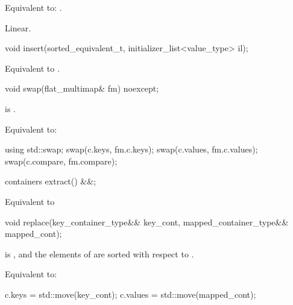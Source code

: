 \begin{codeblock}
\begin{codeblock}
\begin{codeblock}
\begin{addedblock}
\begin{itemdescr}
\pnum \effects Equivalent to: .

\pnum \complexity Linear.
\end{itemdescr}

%
\begin{itemdecl}
void insert(sorted_equivalent_t, initializer_list<value_type> il);
\end{itemdecl}

\begin{itemdescr}
\pnum \effects Equivalent to .
\end{itemdescr}

%
\begin{itemdecl}
void swap(flat_multimap& fm) noexcept;
\end{itemdecl}

\begin{itemdescr}
\pnum \constraints {} is .

\pnum \effects Equivalent to:
\begin{codeblock}
using std::swap;
swap(c.keys, fm.c.keys);
swap(c.values, fm.c.values);
swap(c.compare, fm.compare);
\end{codeblock}
\end{itemdescr}

%
\begin{itemdecl}
containers extract() &&;
\end{itemdecl}

\begin{itemdescr}
\effects Equivalent to 
\end{itemdescr}

%
\begin{itemdecl}
void replace(key_container_type&& key_cont, mapped_container_type&& mapped_cont);
\end{itemdecl}

\begin{itemdescr}
\pnum \expects
{} is , and the elements of
 are sorted with respect to .

\pnum
\effects Equivalent to:
\begin{codeblock}
c.keys = std::move(key_cont);
c.values = std::move(mapped_cont);
\end{codeblock}
\end{itemdescr}


\end{addedblock}
\end{codeblock}
\end{codeblock}
\end{codeblock}
